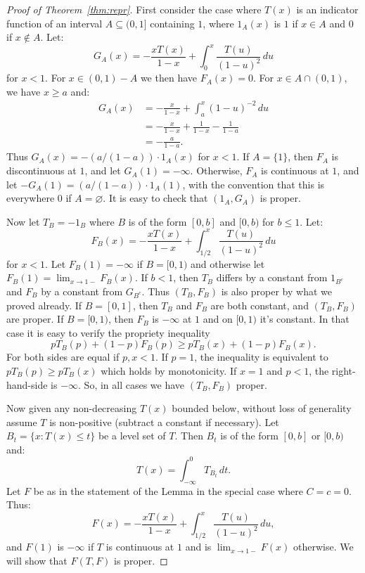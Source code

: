 \documentclass[10pt,a4paper]{amsart}
\begin{document}
\begin{proof}[Proof of Theorem~\ref{thm:repr}]
First consider the case where $T(x)$ is an indicator function of an interval $A \subseteq (0,1]$ containing
$1$, where $1_A(x)$ is $1$ if
$x\in A$ and $0$ if $x\notin A$. Let:
$$
	G_A(x) = -\frac{xT(x)}{1-x}+\int_0^x \frac{T(u)}{(1-u)^2} \, du
$$
for $x<1$. For $x \in (0,1)-A$ we then have $F_A(x)=0$. For $x \in A\cap (0,1)$, we have $x\ge a$ and:
$$
\begin{aligned}
	G_A(x) &= -\frac{x}{1-x}+\int_a^x (1-u)^{-2} \,du \\
		 &= -\frac{x}{1-x}+\frac{1}{1-x}-\frac{1}{1-a} \\
		 &= -\frac{a}{1-a}.
\end{aligned}
$$		 
Thus $G_A(x) = -(a/(1-a))\cdot 1_A(x)$ for $x<1$. If $A=\{ 1 \}$, then $F_A$ is discontinuous at $1$,
and let $G_A(1)=-\infty$. Otherwise, $F_A$ is continuous at $1$, and let $-G_A(1)=(a/(1-a))\cdot 1_A(1)$, 
with the convention that this is everywhere $0$ if $A=\varnothing$. It is easy to check that 
$(1_A,G_A)$ is proper.

Now let $T_B = -1_B$ where $B$ is of the form $[0,b]$ and $[0,b)$ for $b\le 1$. Let:
$$
	F_B(x) = -\frac{xT(x)}{1-x}+\int_{1/2}^x \frac{T(u)}{(1-u)^2} \, du
$$
for $x<1$. Let $F_B(1)=-\infty$ if $B=[0,1)$ and otherwise let $F_B(1)=\lim_{x\to 1-} F_B(x)$.
If $b<1$, then $T_B$ differs by a constant from $1_{B^c}$ and $F_B$ by a constant from $G_{B^c}$. Thus
$(T_B,F_B)$ is also proper by what we proved already. If $B=[0,1]$, then $T_B$ and $F_B$ are both constant, and
$(T_B,F_B)$ are proper. If $B=[0,1)$, then $F_B$ is $-\infty$ at $1$ and on $[0,1)$ it's constant. In that
case it is easy to verify the propriety inequality
$$
	p T_B(p) + (1-p) F_B(p) \ge p T_B(x) + (1-p) F_B(x).
$$
For both sides are equal if $p,x<1$. If $p=1$, the inequality is equivalent to $p T_B(p) \ge p T_B(x)$ which
holds by monotonicity. If $x=1$ and $p<1$, the right-hand-side is $-\infty$. So, in all cases we have
$(T_B,F_B)$ proper.

Now given any non-decreasing $T(x)$ bounded below, without loss of generality assume $T$ is non-positive
(subtract a constant if necessary). Let $B_t=\{ x : T(x) \le t \}$ be a level set of $T$. Then $B_t$ is of the form 
$[0,b]$ or $[0,b)$ and:
\begin{equation}\label{eq:Tint}
	T(x) = \int_{-\infty}^0 T_{B_t} \, dt.
\end{equation}
Let $F$ be as in the statement of the Lemma in the special case where $C=c=0$. Thus:
$$
	F(x) = -\frac{xT(x)}{1-x}+\int_{1/2}^x \frac{T(u)}{(1-u)^2} \, du,
$$
and $F(1)$ is $-\infty$ if $T$ is continuous at $1$ and is $\lim_{x\to1-} F(x)$ otherwise.
We will show that $F(T,F)$ is proper.


\end{proof}
\end{document}
